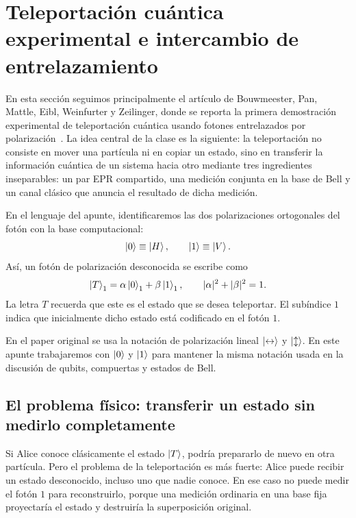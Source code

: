 \documentclass[../main.tex]{subfiles}
\begin{document}
\chapter{Teleportación cuántica experimental e intercambio de entrelazamiento}

En esta sección seguimos principalmente el artículo de Bouwmeester, Pan, Mattle, Eibl, Weinfurter y Zeilinger, donde se reporta la primera demostración experimental de teleportación cuántica usando fotones entrelazados por polarización~\cite{Bouwmeester1997}. La idea central de la clase es la siguiente: la teleportación no consiste en mover una partícula ni en copiar un estado, sino en transferir la información cuántica de un sistema hacia otro mediante tres ingredientes inseparables: un par EPR compartido, una medición conjunta en la base de Bell y un canal clásico que anuncia el resultado de dicha medición.

En el lenguaje del apunte, identificaremos las dos polarizaciones ortogonales del fotón con la base computacional:
\begin{equation*}
    \ket{0}\equiv \ket{H},
    \qquad
    \ket{1}\equiv \ket{V}.
\end{equation*}
Así, un fotón de polarización desconocida se escribe como
\begin{equation*}
    \ket{T}_1=\alpha\ket{0}_1+\beta\ket{1}_1,
    \qquad
    |\alpha|^2+|\beta|^2=1.
\end{equation*}
La letra $T$ recuerda que este es el estado que se desea teleportar. El subíndice $1$ indica que inicialmente dicho estado está codificado en el fotón $1$.

\begin{observacion}
En el paper original se usa la notación de polarización lineal $\ket{\leftrightarrow}$ y $\ket{\updownarrow}$. En este apunte trabajaremos con $\ket{0}$ y $\ket{1}$ para mantener la misma notación usada en la discusión de qubits, compuertas y estados de Bell.
\end{observacion}

\section{El problema físico: transferir un estado sin medirlo completamente}

Si Alice conoce clásicamente el estado $\ket{T}$, podría prepararlo de nuevo en otra partícula. Pero el problema de la teleportación es más fuerte: Alice puede recibir un estado desconocido, incluso uno que nadie conoce. En ese caso no puede medir el fotón $1$ para reconstruirlo, porque una medición ordinaria en una base fija proyectaría el estado y destruiría la superposición original.
\end{document}
